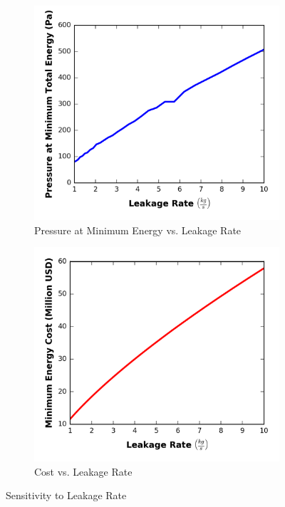 \begin{figure}
\centering
\begin{subfigure}{.5\textwidth}
  \centering
  \includegraphics{../../images/graphs/leakage_trades/leakage_vs_pressure.png}
  \caption{Pressure at Minimum Energy vs. Leakage Rate}
  \label{fig:leak_v_p}
\end{subfigure}%
\begin{subfigure}{.5\textwidth}
  \centering
  \includegraphics{../../images/graphs/leakage_trades/leakage_vs_cost.png}
  \caption{Cost vs. Leakage Rate}
  \label{fig:leak_v_c}
\end{subfigure}
\caption{Sensitivity to Leakage Rate}
\label{fig:pres_vs_leakage_rate}
\end{figure}

